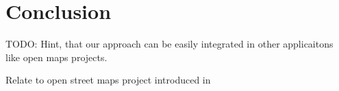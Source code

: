 \chapter{Conclusion}\label{chapter:conclusion}

TODO: Hint, that our approach can be easily integrated in other applicaitons like open maps projects.

Relate to open street maps project introduced in \parencite{krumm}